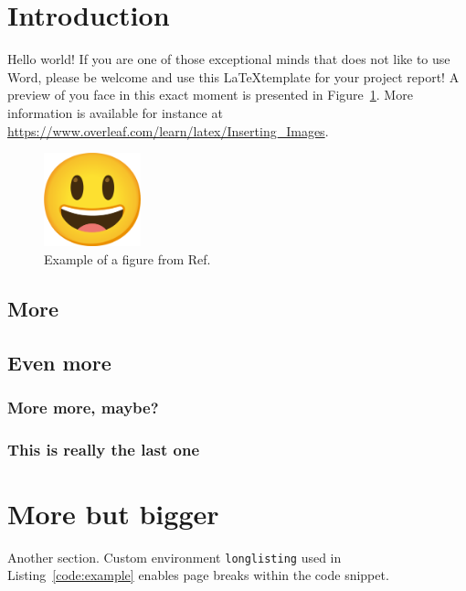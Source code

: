 \section{Introduction}

Hello world! If you are one of those exceptional minds that does not like to use Word, please be welcome and use this \LaTeX template for your project report! A preview of you face in this exact moment is presented in Figure~\ref{fig:example}.
More information is available for instance at \url{https://www.overleaf.com/learn/latex/Inserting_Images}.

\begin{figure}[h]
    \centering
    \includegraphics[width=0.25\textwidth]{demo/smile.png}
    \caption{Example of a figure from Ref.~\cite{exampleCitation}}
    \label{fig:example}
\end{figure}



\subsection{More}

\lipsum[1]

\subsection{Even more}

\lipsum[2]

\subsubsection{More more, maybe?}

\lipsum[3-4]


\subsubsection{This is really the last one}

\lipsum[5]







\section{More but bigger}
Another section.
\ifprintCode
Custom environment \texttt{longlisting} used in Listing~\ref{code:example} enables page breaks within the code snippet.

